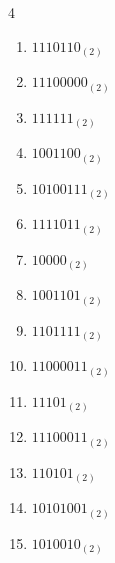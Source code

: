 \begin{multicols}{4}
\begin{enumerate}
        \phantom{$=126$}

  \item $1110110_{(2)}$

        \phantom{$=118$}

\columnbreak %

  \item $11100000_{(2)}$

        \phantom{$=224$}

  \item $111111_{(2)}$

        \phantom{$=63$}

  \item $1001100_{(2)}$

        \phantom{$=76$}

  \item $10100111_{(2)}$

        \phantom{$=167$}

  \item $1111011_{(2)}$

        \phantom{$=123$}

  \item $10000_{(2)}$

        \phantom{$=16$}

  \item $1001101_{(2)}$

        \phantom{$=77$}

  \item $1101111_{(2)}$

        \phantom{$=111$}

  \item $11000011_{(2)}$

        \phantom{$=195$}

  \item $11101_{(2)}$

        \phantom{$=29$}

  \item $11100011_{(2)}$

        \phantom{$=227$}

  \item $110101_{(2)}$

        \phantom{$=53$}

  \item $10101001_{(2)}$

        \phantom{$=169$}

  \item $1010010_{(2)}$


\end{enumerate}
\end{multicols}

